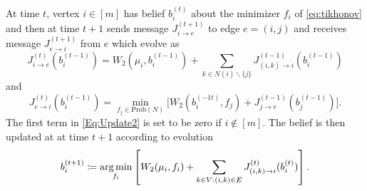 \documentclass[letterpaper]{article} %
\begin{document}
At time $t$, vertex $i\in [m]$ has belief $b^{(t)}_i$ about the minimizer $f_i$ of \eqref{eq:tikhonov} and then at time $t+1$ sends message $J^{(t+1)}_{i\to e}$ to edge $e=(i, j)$ and receives message $J^{(t+1)}_{e\to i}$ from $e$ which evolve as
\begin{equation}\label{Eq:Update2}
J^{(t)}_{i\to e} (b^{(t-1)}_i) = W_2(\mu_i, b^{(t-1)}_i) + \sum_{k\in N(i)\backslash \{j\}}J^{(t-1)}_{(i,k)\to i}(b^{(t-1)}_i)
\end{equation}
and 
\begin{equation}\label{Eq:Update}
    J^{(t)}_{e\to i}(b^{(t-1)}_i) =  \min_{f_j\in \mathrm{Prob}(N)}\Big[W_2(b^{(-1t)}_i, f_j) + J^{(t-1)}_{j\to e}(b^{(t-1)}_j)\Big].
\end{equation}
The first term in \eqref{Eq:Update2} is set to be zero if $i\notin [m]$. The belief is then updated at at time $t+1$ according to evolution
$$b^{(t+1)}_i \coloneqq \mathop{\rm arg\, min}_{f_i} \left[W_2(\mu_i, f_i) + \sum_{k\in V: (i, k)\in E } J^{(t)}_{(i, k)\to i}(b^{(t)}_i)\right].$$
\end{document}
